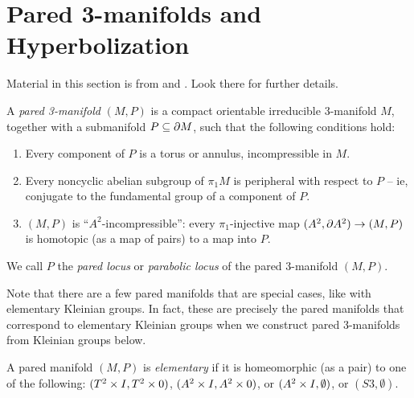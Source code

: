 \section{Pared 3-manifolds and Hyperbolization}

Material in this section is from \cite{Mo} and \cite{CMc}. Look there for
further details.

%
\begin{defn}

A \emph{pared 3-manifold} $(M,P)$ is a compact orientable irreducible
3-manifold $M$, together with a submanifold $P\subseteq\partial M$, such that the
following conditions hold:

\begin{enumerate}
\item Every component of $P$ is a torus or annulus, incompressible in $M$.

\item Every noncyclic abelian subgroup of $\pi_1M$ is peripheral with respect
to $P$ -- ie, conjugate to the fundamental group of a component of $P$.

\item $(M,P)$ is ``$A^2$-incompressible'': every $\pi_1$-injective map $(A^2,
\partial A^2) \to (M,P)$ is homotopic (as a map of pairs) to a map into $P$.

\end{enumerate}

We call $P$ the \emph{pared locus} or \emph{parabolic locus} of the pared
3-manifold $(M,P)$.

\end{defn}

Note that there are a few pared manifolds that are special cases, like with
elementary Kleinian groups. In fact, these are precisely the pared manifolds
that correspond to elementary Kleinian groups when we construct pared
3-manifolds from Kleinian groups below.

\begin{defn}

A pared manifold $(M,P)$ is \emph{elementary} if it is homeomorphic (as a pair)
to one of the following: $(T^2\times I,T^2\times 0)$, $(A^2\times I,A^2\times 0)$, or $(A^2\times
I,\emptyset)$, or $(S3,\emptyset)$.

\end{defn}

